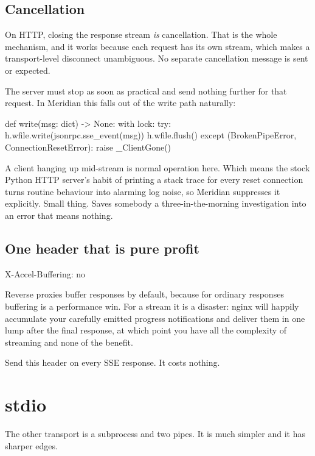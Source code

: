 \subsection{Cancellation}

On HTTP, closing the response stream \emph{is} cancellation. That is the whole
mechanism, and it works because each request has its own stream, which makes a
transport-level disconnect unambiguous. No separate cancellation message is sent
or expected.

The server must stop as soon as practical and send nothing further for that
request. In Meridian this falls out of the write path naturally:

\begin{py}
def write(msg: dict) -> None:
    with lock:
        try:
            h.wfile.write(jsonrpc.sse_event(msg))
            h.wfile.flush()
        except (BrokenPipeError, ConnectionResetError):
            raise _ClientGone()
\end{py}

A client hanging up mid-stream is normal operation here. Which
means the stock Python HTTP server's habit of printing a stack trace for every
reset connection turns routine behaviour into alarming log noise, so Meridian
suppresses it explicitly. Small thing. Saves somebody a three-in-the-morning
investigation into an error that means nothing.

\subsection{One header that is pure profit}

\begin{http}
X-Accel-Buffering: no
\end{http}

Reverse proxies buffer responses by default, because for ordinary responses
buffering is a performance win. For a stream it is a disaster: nginx will happily
accumulate your carefully emitted progress notifications and deliver them in one
lump after the final response, at which point you have all the complexity of
streaming and none of the benefit.

Send this header on every SSE response. It costs nothing.

\section{stdio}

The other transport is a subprocess and two pipes. It is much simpler and it has
sharper edges.

